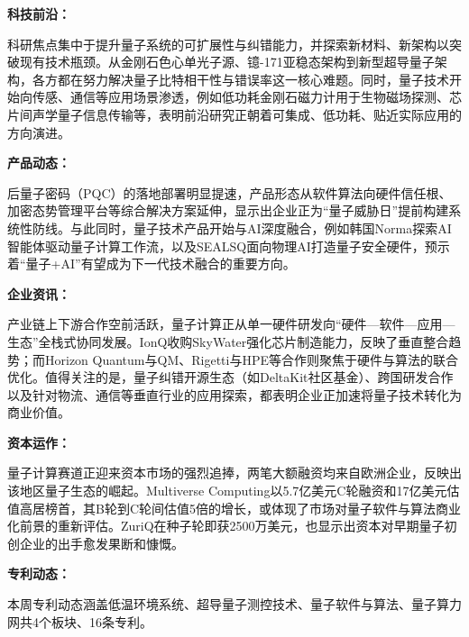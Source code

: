 \documentclass[12pt,a4paper]{ctexart}
\begin{document}
\textbf{ 科技前沿：}

科研焦点集中于提升量子系统的可扩展性与纠错能力，并探索新材料、新架构以突破现有技术瓶颈。从金刚石色心单光子源、镱-171亚稳态架构到新型超导量子架构，各方都在努力解决量子比特相干性与错误率这一核心难题。同时，量子技术开始向传感、通信等应用场景渗透，例如低功耗金刚石磁力计用于生物磁场探测、芯片间声学量子信息传输等，表明前沿研究正朝着可集成、低功耗、贴近实际应用的方向演进。


\textbf{ 产品动态：}

后量子密码（PQC）的落地部署明显提速，产品形态从软件算法向硬件信任根、加密态势管理平台等综合解决方案延伸，显示出企业正为“量子威胁日”提前构建系统性防线。与此同时，量子技术产品开始与AI深度融合，例如韩国Norma探索AI智能体驱动量子计算工作流，以及SEALSQ面向物理AI打造量子安全硬件，预示着“量子+AI”有望成为下一代技术融合的重要方向。


\textbf{ 企业资讯：}

产业链上下游合作空前活跃，量子计算正从单一硬件研发向“硬件—软件—应用—生态”全栈式协同发展。IonQ收购SkyWater强化芯片制造能力，反映了垂直整合趋势；而Horizon Quantum与QM、Rigetti与HPE等合作则聚焦于硬件与算法的联合优化。值得关注的是，量子纠错开源生态（如DeltaKit社区基金）、跨国研发合作以及针对物流、通信等垂直行业的应用探索，都表明企业正加速将量子技术转化为商业价值。


\textbf{ 资本运作：}

量子计算赛道正迎来资本市场的强烈追捧，两笔大额融资均来自欧洲企业，反映出该地区量子生态的崛起。Multiverse Computing以5.7亿美元C轮融资和17亿美元估值高居榜首，其B轮到C轮间估值5倍的增长，或体现了市场对量子软件与算法商业化前景的重新评估。ZuriQ在种子轮即获2500万美元，也显示出资本对早期量子初创企业的出手愈发果断和慷慨。




\textbf{ 专利动态：}

本周专利动态涵盖低温环境系统、超导量子测控技术、量子软件与算法、量子算力网共4个板块、16条专利。
\end{document}
